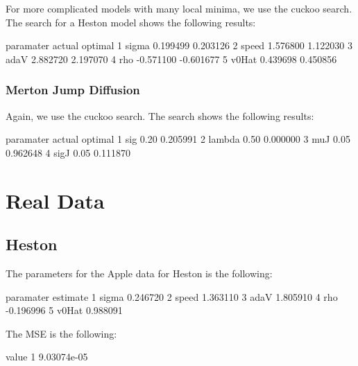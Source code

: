 \documentclass{article}
\begin{document}
For more complicated models with many local minima, we use the cuckoo search. The search for a Heston model shows the following results:

\begin{Schunk}
\begin{Soutput}
  paramater    actual   optimal
1     sigma  0.199499  0.203126
2     speed  1.576800  1.122030
3      adaV  2.882720  2.197070
4       rho -0.571100 -0.601677
5     v0Hat  0.439698  0.450856
\end{Soutput}
\end{Schunk}


\subsubsection{Merton Jump Diffusion}

Again, we use the cuckoo search. The search shows the following results:

\begin{Schunk}
\begin{Soutput}
  paramater actual  optimal
1       sig   0.20 0.205991
2    lambda   0.50 0.000000
3       muJ   0.05 0.962648
4      sigJ   0.05 0.111870
\end{Soutput}
\end{Schunk}


\section{Real Data}

\subsection{Heston}

The parameters for the Apple data for Heston is the following:

\begin{Schunk}
\begin{Soutput}
  paramater  estimate
1     sigma  0.246720
2     speed  1.363110
3      adaV  1.805910
4       rho -0.196996
5     v0Hat  0.988091
\end{Soutput}
\end{Schunk}

The MSE is the following:

\begin{Schunk}
\begin{Soutput}
        value
1 9.03074e-05
\end{Soutput}
\end{Schunk}
\end{document}
